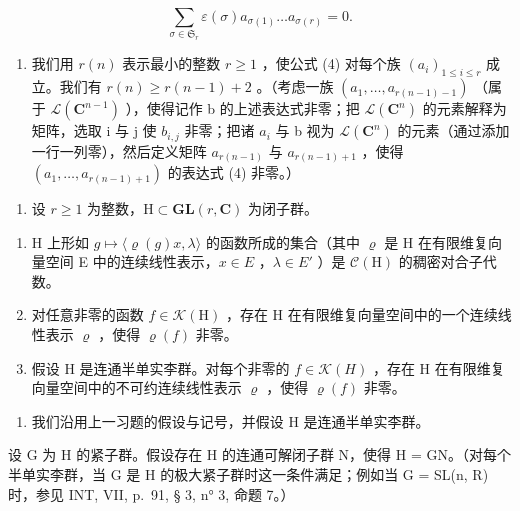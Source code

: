 \[
\sum_ {\sigma \in \mathfrak {S} _ {r}} \varepsilon (\sigma) a _ {\sigma (1)} \dots a _ {\sigma (r)} = 0.\tag{4}
\]

\begin{enumerate}
\def\labelenumi{\alph{enumi})}
\setcounter{enumi}{1}
\tightlist
\item
  我们用 \(r(n)\) 表示最小的整数 \(r \geqslant 1\) ，使公式 (4) 对每个族 \((a_i)_{1 \leqslant i \leqslant r}\) 成立。我们有 \(r(n) \geqslant r(n-1) + 2\) 。（考虑一族 \((a_1, \ldots, a_{r(n-1)-1})\) （属于 \(\mathcal{L}(\mathbf{C}^{n-1})\) ），使得记作 b 的上述表达式非零；把 \(\mathcal{L}(\mathbf{C}^n)\) 的元素解释为矩阵，选取 i 与 j 使 \(b_{i,j}\) 非零；把诸 \(a_i\) 与 b 视为 \(\mathcal{L}(\mathbf{C}^n)\) 的元素（通过添加一行一列零），然后定义矩阵 \(a_{r(n-1)}\) 与 \(a_{r(n-1)+1}\) ，使得 \((a_1, \ldots, a_{r(n-1)+1})\) 的表达式 (4) 非零。）
\end{enumerate}

\begin{enumerate}
\def\labelenumi{\arabic{enumi})}
\setcounter{enumi}{21}
\tightlist
\item
  设 \(r \geqslant 1\) 为整数，\(\mathrm{H} \subset \mathbf{GL}(r, \mathbf{C})\) 为闭子群。
\end{enumerate}

\begin{enumerate}
\def\labelenumi{\alph{enumi})}
\item
  H 上形如 \(g \mapsto \langle \varrho(g)x, \lambda \rangle\) 的函数所成的集合（其中 \(\varrho\) 是 H 在有限维复向量空间 E 中的连续线性表示，\(x \in E\) ，\(\lambda \in E'\) ）是 \(\mathcal{C}(\mathrm{H})\) 的稠密对合子代数。
\item
  对任意非零的函数 \(f \in \mathcal{K}(\mathrm{H})\) ，存在 H 在有限维复向量空间中的一个连续线性表示 \(\varrho\) ，使得 \(\varrho(f)\) 非零。
\item
  假设 H 是连通半单实李群。对每个非零的 \(f \in \mathcal{K}(H)\) ，存在 H 在有限维复向量空间中的不可约连续线性表示 \(\varrho\) ，使得 \(\varrho(f)\) 非零。
\end{enumerate}

\begin{enumerate}
\def\labelenumi{\arabic{enumi})}
\setcounter{enumi}{22}
\tightlist
\item
  我们沿用上一习题的假设与记号，并假设 H 是连通半单实李群。
\end{enumerate}

设 G 为 H 的紧子群。假设存在 H 的连通可解闭子群 N，使得 H = GN。（对每个半单实李群，当 G 是 H 的极大紧子群时这一条件满足；例如当 G = SL(n, R) 时，参见 INT, VII, p.~91, § 3, n° 3, 命题 7。）

